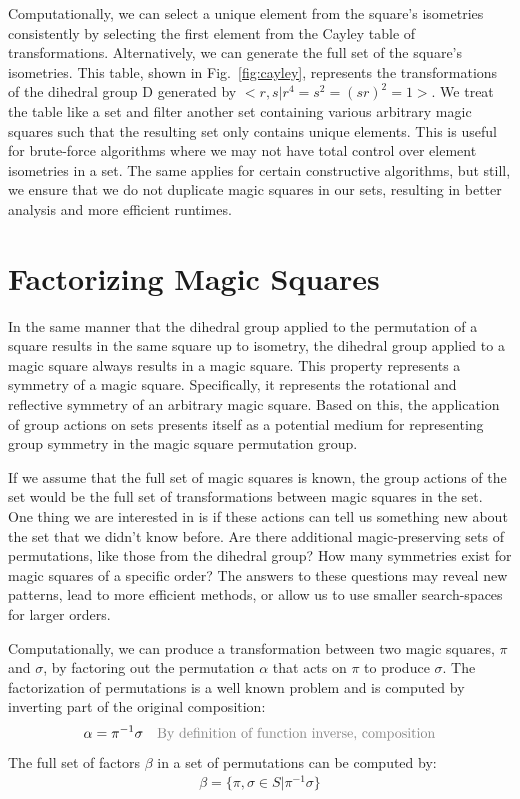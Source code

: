 \documentclass[12pt]{report}
\def\light#1{{\color{light}#1}}
\begin{document}
\par Computationally, we can select a unique element from the square's isometries consistently
by selecting the first element from the Cayley table of transformations. Alternatively, we can
generate the full set of the square's isometries. This table, shown in Fig.~\ref{fig:cayley}, represents
the transformations of the dihedral group D generated by $<r,s\vert
  r^4=s^2={\left(sr\right)}^2=1>$. We treat the table like a set and filter another set containing
various arbitrary magic squares such that the resulting set only contains unique elements. This is
useful for brute-force algorithms where we may not have total control over element isometries in a
set. The same applies for certain constructive algorithms, but still, we ensure that we do not
duplicate magic squares in our sets, resulting in better analysis and more efficient runtimes.

\section{Factorizing Magic Squares}

\par In the same manner that the dihedral group applied to the permutation of a square results in
the same square up to isometry, the dihedral group applied to a magic square always results in a magic square.
This property represents a symmetry of a magic square. Specifically, it represents the rotational
and reflective symmetry of an arbitrary magic square. Based on this, the application of group
actions on sets presents itself as a potential medium for representing group symmetry in the magic
square permutation group.

\par If we assume that the full set of magic squares is known, the group actions of the set would
be the full set of transformations between magic squares in the set. One thing we are interested in
is if these actions can tell us something new about the set that we didn't know before. Are there
additional magic-preserving sets of permutations, like those from the dihedral group? How many
symmetries exist for magic squares of a specific order? The answers to these questions may reveal
new patterns, lead to more efficient methods, or allow us to use smaller search-spaces for larger
orders.

\par Computationally, we can produce a transformation between two magic squares, $\pi$ and
$\sigma$, by factoring out the permutation $\alpha$ that acts on $\pi$ to produce $\sigma$. The
factorization of permutations is a well known problem and is computed by inverting part of the
original composition:
\begin{align}
  \alpha=\pi^{-1}\sigma &  & \text{\light{By definition of function inverse, composition}}
\end{align}
The full set of factors $\beta$ in a set of permutations can be computed by:
\begin{align}
  \beta = \{\pi,\sigma\in S | \pi^{-1}\sigma\}
\end{align}
\end{document}
